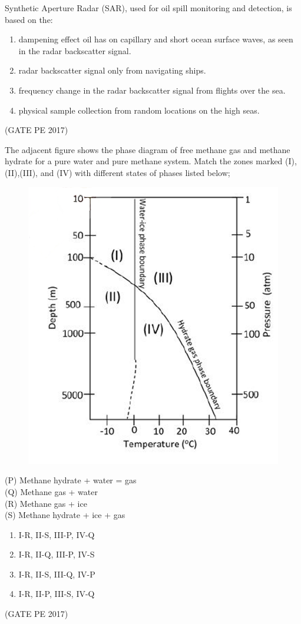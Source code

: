 \documentclass[journal,12pt,onecolumn]{IEEEtran}
\theoremstyle{remark}
\begin{document}
\begin{enumerate}
{\item Synthetic Aperture Radar (SAR), used for oil spill monitoring and detection, is based on the:\\
\begin{enumerate}
\item dampening effect oil has on capillary and short ocean surface waves, as seen in the radar backscatter signal.
\item radar backscatter signal only from navigating ships.
\item frequency change in the radar backscatter signal from flights over the sea.
\item physical sample collection from random locations on the high seas.
\end{enumerate}
\hfill{(GATE PE 2017)}

\item The adjacent figure shows the phase diagram of free methane gas and methane hydrate for a pure water and pure methane system. Match the zones marked (I),(II),(III), and (IV) with different states of phases listed below;

\begin{figure}[h]
    \centering
    \includegraphics[width=0.5\columnwidth]{Graph_Q55.png}
\end{figure}
(P) Methane hydrate + water = gas\\
(Q) Methane gas + water\\
(R) Methane gas + ice\\
(S) Methane hydrate + ice + gas\\

\begin{enumerate}
    \item I-R, II-S, III-P, IV-Q
    \item I-R, II-Q, III-P, IV-S
    \item I-R, II-S, III-Q, IV-P
    \item I-R, II-P, III-S, IV-Q
\end{enumerate}
\hfill{(GATE PE 2017)}

}
\end{enumerate}
\end{document}
